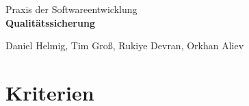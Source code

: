 \documentclass[parskip=full]{scrartcl}
\begin{document}
	\begin{titlepage}
		
		\centering
		\vspace*{0.2\textheight}
		{\Large Praxis der Softwareentwicklung}\\[\baselineskip]
		\vspace{2cm}
		{\Huge \textbf{Qualitätssicherung}}\\[\baselineskip]\par
		\vspace{2cm}
		{\LARGE Daniel Helmig, Tim Groß, Rukiye Devran, Orkhan Aliev}\par		
		\newpage	
		\tableofcontents
		\pagebreak
		
	\end{titlepage}
	\section{Kriterien}
\end{document}
